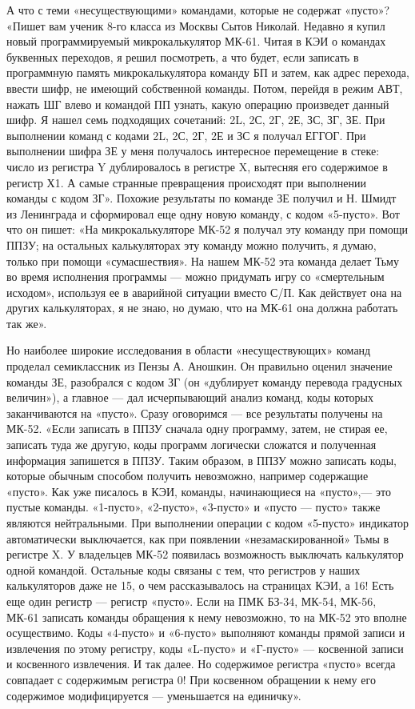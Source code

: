 \documentclass[11pt,a4paper,oneside]{article}
\begin{document}
А что с теми «несуществующими» командами, которые не содержат «пусто»? «Пишет вам ученик 8-го класса из Москвы Сытов Николай. Недавно я купил новый программируемый микрокалькулятор МК-61. Читая в КЭИ о командах буквенных переходов, я решил посмотреть, а что будет, если записать в программную память микрокалькулятора команду БП и затем, как адрес перехода, ввести шифр, не имеющий собственной команды. Потом, перейдя в режим АВТ, нажать ШГ влево и командой ПП узнать, какую операцию произведет данный шифр. Я нашел семь подходящих сочетаний: 2L, 2С, 2Г, 2Е, ЗС, ЗГ, ЗЕ. При выполнении команд с кодами 2L, 2С, 2Г, 2Е и ЗС я получал ЕГГОГ. При выполнении шифра ЗЕ у меня получалось интересное перемещение в стеке: число из регистра Y дублировалось в регистре X, вытесняя его содержимое в регистр Х1. А самые странные превращения происходят при выполнении команды с кодом ЗГ». Похожие результаты по команде ЗЕ получил и Н. Шмидт из Ленинграда и сформировал еще одну новую команду, с кодом «5-пусто». Вот что он пишет: «На микрокалькуляторе МК-52 я получал эту команду при помощи ППЗУ; на остальных калькуляторах эту команду можно получить, я думаю, только при помощи «сумасшествия». На нашем МК-52 эта команда делает Тьму во время исполнения программы — можно придумать игру со «смертельным исходом», используя ее в аварийной ситуации вместо С/П. Как действует она на других калькуляторах, я не знаю, но думаю, что на МК-61 она должна работать так же».

Но наиболее широкие исследования в области «несуществующих» команд проделал семиклассник из Пензы А. Аношкин. Он правильно оценил значение команды ЗЕ, разобрался с кодом ЗГ (он «дублирует команду перевода градусных величин»), а главное — дал исчерпывающий анализ команд, коды которых заканчиваются на «пусто». Сразу оговоримся — все результаты получены на МК-52. «Если записать в ППЗУ сначала одну программу, затем, не стирая ее, записать туда же другую, коды программ логически сложатся и полученная информация запишется в ППЗУ. Таким образом, в ППЗУ можно записать коды, которые обычным способом получить невозможно, например содержащие «пусто». Как уже писалось в КЭИ, команды, начинающиеся на «пусто»,— это пустые команды. «1-пусто», «2-пусто», «3-пусто» и «пусто — пусто» также являются нейтральными. При выполнении операции с кодом «5-пусто» индикатор автоматически выключается, как при появлении «незамаскированной» Тьмы в регистре X. У владельцев МК-52 появилась возможность выключать калькулятор одной командой. Остальные коды связаны с тем, что регистров у наших калькуляторов даже не 15, о чем рассказывалось на страницах КЭИ, а 16! Есть еще один регистр — регистр «пусто». Если на ПМК БЗ-34, МК-54, МК-56, МК-61 записать команды обращения к нему невозможно, то на МК-52 это вполне осуществимо. Коды «4-пусто» и «6-пусто» выполняют команды прямой записи и извлечения по этому регистру, коды «L-пусто» и «Г-пусто» — косвенной записи и косвенного извлечения. И так далее. Но содержимое регистра «пусто» всегда совпадает с содержимым регистра 0! При косвенном обращении к нему его содержимое модифицируется — уменьшается на единичку».
\end{document}
